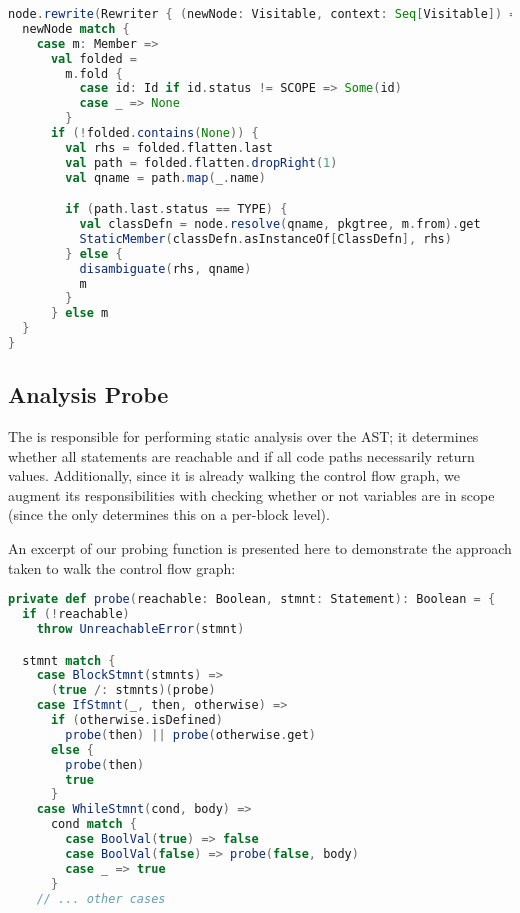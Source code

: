 \documentclass{article}
\begin{document}
\begin{lstlisting}[language=Scala]
node.rewrite(Rewriter { (newNode: Visitable, context: Seq[Visitable]) =>
  newNode match {
    case m: Member =>
      val folded =
        m.fold {
          case id: Id if id.status != SCOPE => Some(id)
          case _ => None
        }
      if (!folded.contains(None)) {
        val rhs = folded.flatten.last
        val path = folded.flatten.dropRight(1)
        val qname = path.map(_.name)

        if (path.last.status == TYPE) {
          val classDefn = node.resolve(qname, pkgtree, m.from).get
          StaticMember(classDefn.asInstanceOf[ClassDefn], rhs)
        } else {
          disambiguate(rhs, qname)
          m
        }
      } else m
  }
}
\end{lstlisting}



\subsection{Analysis Probe}
The  is responsible for performing static analysis over the AST; it determines whether all
statements are reachable and if all code paths necessarily return values. Additionally, since it is already walking the
control flow graph, we augment its responsibilities with checking whether or not variables are in scope (since the
 only determines this on a per-block level).

An excerpt of our probing function is presented here to demonstrate the approach taken to walk the control flow graph:

\begin{lstlisting}[language=Scala]
private def probe(reachable: Boolean, stmnt: Statement): Boolean = {
  if (!reachable)
    throw UnreachableError(stmnt)

  stmnt match {
    case BlockStmnt(stmnts) =>
      (true /: stmnts)(probe)
    case IfStmnt(_, then, otherwise) =>
      if (otherwise.isDefined)
        probe(then) || probe(otherwise.get)
      else {
        probe(then)
        true
      }
    case WhileStmnt(cond, body) =>
      cond match {
        case BoolVal(true) => false
        case BoolVal(false) => probe(false, body)
        case _ => true
      }
    // ... other cases
\end{lstlisting}
\end{document}
